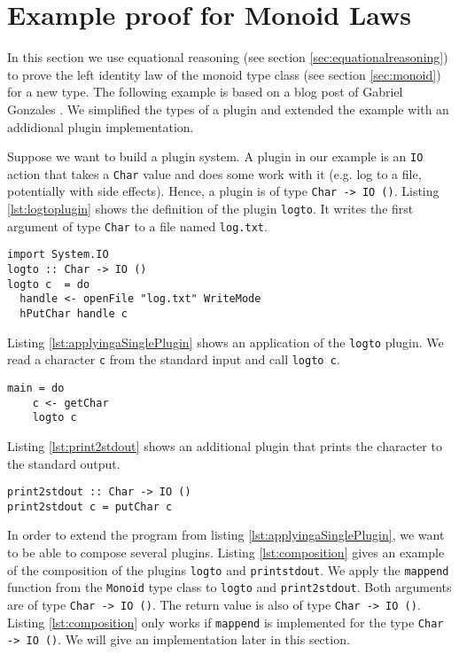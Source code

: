 \section{Example proof for Monoid Laws}
\label{sec:example}
In this section we use equational reasoning (see section \ref{sec:equationalreasoning}) to prove the left identity law of the monoid type class (see section \ref{sec:monoid}) for a new type.
The following example is based on a blog post of Gabriel Gonzales \cite{gonzales14}. We simplified the types of a plugin and extended the example with an addidional plugin implementation.

Suppose we want to build a plugin system. A plugin in our example is an \verb|IO| action that takes a \verb|Char| value and does some work with it (e.g. log to a file, potentially with side effects). Hence, a plugin is of type \verb|Char -> IO ()|. Listing \ref{lst:logtoplugin} shows the definition of the plugin \verb|logto|. It writes the first argument of type \verb|Char| to a file named \verb|log.txt|.

\begin{lstlisting}[caption={Definition of a plugin that writes a character to a file.}, label={lst:logtoplugin}]
import System.IO
logto :: Char -> IO ()
logto c  = do
  handle <- openFile "log.txt" WriteMode
  hPutChar handle c
\end{lstlisting}

Listing \ref{lst:applyingaSinglePlugin} shows an application of the \verb|logto| plugin. We read a character \verb|c| from the standard input and call \verb|logto c|.

\begin{lstlisting}[caption={Calling the {\ttfamily logto} IO action in main}, label={lst:applyingaSinglePlugin}]
main = do
    c <- getChar
    logto c
\end{lstlisting}

Listing \ref{lst:print2stdout} shows an additional plugin that prints the character to the standard output. 

\begin{lstlisting}[caption={Definition of the plugin {\ttfamily print2stdout}}, label={lst:print2stdout}]
print2stdout :: Char -> IO ()
print2stdout c = putChar c
\end{lstlisting}
In order to extend the program from listing \ref{lst:applyingaSinglePlugin}, we want to be able to compose several plugins.
Listing \ref{lst:composition} gives an example of the composition of the plugins \verb|logto| and \verb|printstdout|. We apply the \verb|mappend| function from the \verb|Monoid| type class to \verb|logto| and \verb|print2stdout|. Both arguments are of type \verb|Char -> IO ()|. The return value is also of type \verb|Char -> IO ()|. Listing \ref{lst:composition} only works if \verb|mappend| is implemented for the type \verb|Char -> IO ()|. We will give an implementation later in this section.

